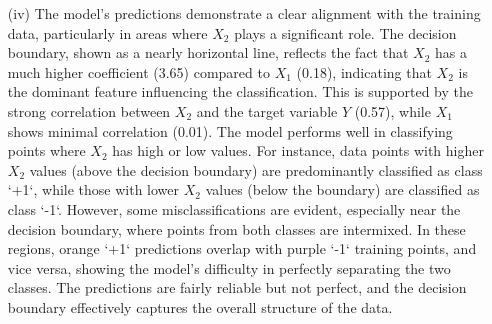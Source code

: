 \documentclass{article}
\begin{document}
\begin{enumerate}
    
    \item[(iv)] The model's predictions demonstrate a clear alignment with the training data, particularly in areas where \(X_2\) plays a significant role. The decision boundary, shown as a nearly horizontal line, reflects the fact that \(X_2\) has a much higher coefficient (3.65) compared to \(X_1\) (0.18), indicating that \(X_2\) is the dominant feature influencing the classification. This is supported by the strong correlation between \(X_2\) and the target variable \(Y\) (0.57), while \(X_1\) shows minimal correlation (0.01). The model performs well in classifying points where \(X_2\) has high or low values. For instance, data points with higher \(X_2\) values (above the decision boundary) are predominantly classified as class `+1`, while those with lower \(X_2\) values (below the boundary) are classified as class `-1`. However, some misclassifications are evident, especially near the decision boundary, where points from both classes are intermixed. In these regions, orange `+1` predictions overlap with purple `-1` training points, and vice versa, showing the model's difficulty in perfectly separating the two classes. The predictions are fairly reliable but not perfect, and the decision boundary effectively captures the overall structure of the data.
\end{enumerate}
\end{document}
